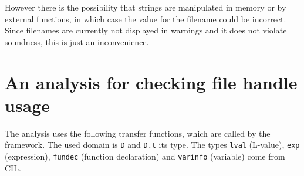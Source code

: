 However there is the possibility that strings are manipulated in memory or by external functions, in which case the value for the filename could be incorrect. Since filenames are currently not displayed in warnings and it does not violate soundness, this is just an inconvenience.



\section{An analysis for checking file handle usage}
The analysis uses the following transfer functions, which are called by the framework. The used domain is \verb|D| and \verb|D.t| its type. The types \verb|lval| (L-value), \verb|exp| (expression), \verb|fundec| (function declaration) and \verb|varinfo| (variable) come from CIL.
